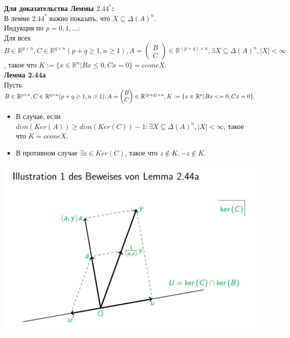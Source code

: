 \noindent\textbf{Для доказательства Леммы $2.44^{\ast}$:}\\
В лемме $2.44^{\ast}$ важно показать, что $X\subseteq \Delta(A)^{n}$.\\
Индукция по $p=0, 1, ...$:\\
Для всех $B\in \mathbb{R}^{p\times n}, C \in \mathbb{R}^{q\times n} (p+q\geq1, n\geq1), A =\begin{pmatrix} B\\C \end{pmatrix}\in \mathbb{R}^{(p+q)\times n}, \exists X \subseteq \Delta(A)^{n}, |X|<\infty$, такое что $K:=\{ x\in \mathbb{R}^{n}| Bx\leq0, Cx=0\}=ccone X$.\\

\noindent\textbf{Лемма 2.44а}\\
Пусть $B\in \mathbb{R}^{p\times n}, C \in \mathbb{R}^{q\times n} (p+q\geq1, n\geq1), A =\begin{pmatrix} B\\C \end{pmatrix}\in \mathbb{R}^{(p+q)\times n},\\ K:=\{x\in \mathbb{R}^{n}|Bx<=0,Cx=0\}.$
\begin{itemize}
\item В случае, если $dim(Ker(A))\geq dim(Ker(C))-1: \exists X\subseteq \Delta(A)^{n}, |X|<\infty$, такое что $K=ccone X$.
\end{itemize}
\begin{itemize}
\item  В противном случае $\exists z\in Ker(C)$, такое что $z\notin K, -z\notin K$.
\end{itemize}
\begin{center}
\includegraphics[scale=0.4]{lm244a.png}
\end{center}
